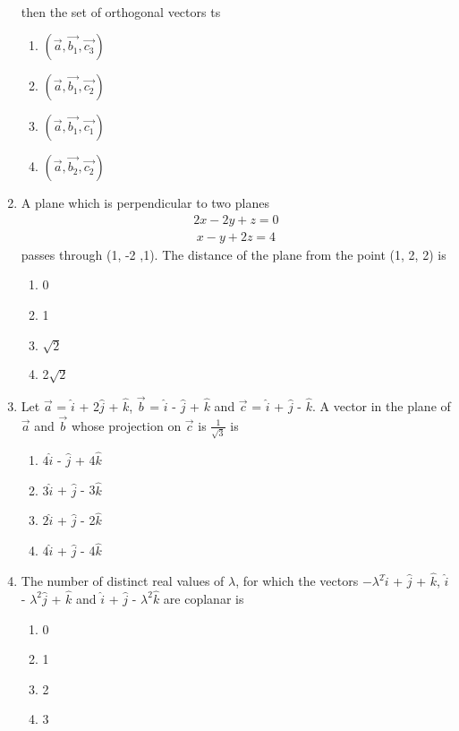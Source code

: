 \begin{enumerate}[label=\arabic*.,ref=\thesubsection.\theenumi]
\begin{align*}
\end{align*}
then the set of orthogonal vectors ts
\begin{enumerate}
\item $(\overrightarrow{a}, \overrightarrow{b_1}, \overrightarrow{c_3})$
\item $(\overrightarrow{a}, \overrightarrow{b_1}, \overrightarrow{c_2})$
\item $(\overrightarrow{a}, \overrightarrow{b_1}, \overrightarrow{c_1})$
\item $(\overrightarrow{a}, \overrightarrow{b_2}, \overrightarrow{c_2})$
\end{enumerate}

\item A plane which is perpendicular to two planes 
\begin{align}
2x - 2y + z = 0
\end{align}
\begin{align}
x - y + 2z = 4
\end{align}
passes through (1, -2 ,1). The distance of the plane from the point (1, 2, 2) is
\begin{enumerate}
\item 0
\item 1
\item $\sqrt{2}$
\item 2$\sqrt{2}$
\end{enumerate}

\item Let $\overrightarrow{a}$ = $\hat{i}$ + 2$\hat{j}$ + $\hat{k}$, $\overrightarrow{b}$ = $\hat{i}$ - $\hat{j}$ + $\hat{k}$ and $\overrightarrow{c}$ = $\hat{i}$ + $\hat{j}$ - $\hat{k}$. A vector in the plane of $\overrightarrow{a}$ and $\overrightarrow{b}$ whose projection on $\overrightarrow{c}$ is $\frac{1}{\sqrt{3}}$ is
\begin{enumerate}
\item $4\hat{i}$ - $\hat{j}$ + 4$\hat{k}$
\item $3\hat{i}$ + $\hat{j}$ - 3$\hat{k}$
\item $2\hat{i}$ + $\hat{j}$ - 2$\hat{k}$
\item $4\hat{i}$ + $\hat{j}$ - 4$\hat{k}$
\end{enumerate}

\item The number of distinct real values of $\lambda$, for which the vectors $-\lambda^{2}\hat{i}$ + $\hat{j}$ + $\hat{k}$, $\hat{i}$ - $\lambda^{2}\hat{j}$ + $\hat{k}$ and $\hat{i}$ + $\hat{j}$ - $\lambda^{2}\hat{k}$ are coplanar is
\begin{enumerate}
\item 0
\item 1
\item 2
\item 3
\end{enumerate}


\end{enumerate}
